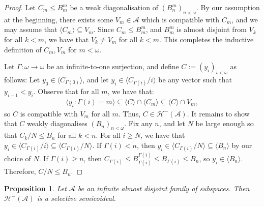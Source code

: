 \documentclass[10pt,a4paper]{amsart}
\theoremstyle{plain}
\numberwithin{equation}{section}
\newtheorem{proposition}[theorem]{Proposition}
\theoremstyle{definition}
\renewcommand{\c}[1]{\langle #1 \rangle}
\newcommand{\cal}{\mathcal}
\newcommand{\A}{\cal{A}}
\renewcommand{\H}{\cal{H}}
\begin{document}
\begin{proof}
    Let $C_m \leq B_m^m$ be a weak diagonalisation of $(B_n^m)_{n<\omega}$. By our assumption at the beginning, there exists some $V_m \in \A$ which is compatible with $C_m$, and we may assume that $\c{C_m} \subseteq V_m$. Since $C_m \leq B_m^m$, and $B_m^m$ is almost disjoint from $V_k$ for all $k < m$, we have that $V_k \neq V_m$ for all $k < m$. This completes the inductive definition of $C_m,V_m$ for $m < \omega$.
    
    Let $\Gamma : \omega \to \omega$ be an infinite-to-one surjection, and define $C := (y_i)_{i<\omega}$ as follows: Let $y_0 \in \c{C_{\Gamma(0)}}$, and let $y_i \in \c{C_{\Gamma(i)}/i}$ be any vector such that $y_{i-1} < y_i$. Observe that for all $m$, we have that:
    \begin{align*}
        \c{y_i : \Gamma(i) = m} \subseteq \c{C} \cap \c{C_m} \subseteq \c{C} \cap V_m,
    \end{align*}
    so $C$ is compatible with $V_m$ for all $m$. Thus, $C \in \H^-(\A)$. It remains to show that $C$ weakly diagonalises $(B_n)_{n<\omega}$. Fix any $n$, and let $N$ be large enough so that $C_k/N \leq B_n$ for all $k < n$. For all $i \geq N$, we have that $y_i \in \c{C_{\Gamma(i)}/i} \subseteq \c{C_{\Gamma(i)}/N}$. If $\Gamma(i) < n$, then $y_i \in \c{C_{\Gamma(i)}/N} \subseteq \c{B_n}$ by our choice of $N$. If $\Gamma(i) \geq n$, then $C_{\Gamma(i)} \leq B_{\Gamma(i)}^{\Gamma(i)} \leq B_{\Gamma(i)} \leq B_n$, so $y_i \in \c{B_n}$. Therefore, $C/N \leq B_n$.
\end{proof}

\begin{proposition}
\label{prop:H^-(A).is.selective}
    Let $\A$ be an infinite almost disjoint family of subspaces. Then $\H^-(\A)$ is a selective semicoideal.
\end{proposition}
\end{document}
